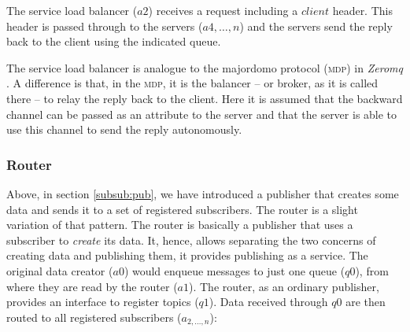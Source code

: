\documentclass[a4paper]{scrartcl}
\newcommand{\acronym}[1]{\textsc{#1}}
\newcommand{\term}[1]{\emph{#1}}
\newcommand{\menqOne}{\diamond}
\newcommand{\connect}[2]{
\draw [->,color=black] (#1) to (#2)
}
\begin{document}

The service load balancer ($a2$) receives a request
including a $client$ header.
This header is passed through to the servers ($a4, \dots, n$)
and the servers send the reply back to the client
using the indicated queue.

The service load balancer is analogue 
to the majordomo protocol (\acronym{mdp}) in \term{Zeromq} \cite{cc13, mdp}.
A difference is that, in the \acronym{mdp}, it is the balancer
-- or broker, as it is called there --
to relay the reply back to the client.
Here it is assumed that the backward channel can be passed
as an attribute to the server
and that the server is able to use this channel
to send the reply autonomously.

\subsubsection{Router}\label{subsub:router}
Above, in section \ref{subsub:pub},
we have introduced a publisher that creates some data
and sends it to a set of registered subscribers.
The router is a slight variation of that pattern.
The router is basically a publisher that uses a subscriber
to \emph{create} its data.
It, hence, allows separating the two concerns of
creating data and publishing them,
it provides publishing as a service.
The original data creator ($a0$) would enqueue
messages to just one queue ($q0$),
from where they are read by the router ($a1$).
The router, as an ordinary publisher,
provides an interface to register topics ($q1$).
Data received through $q0$ are then routed
to all registered subscribers ($a_{2, \dots, n}$):
\end{document}
